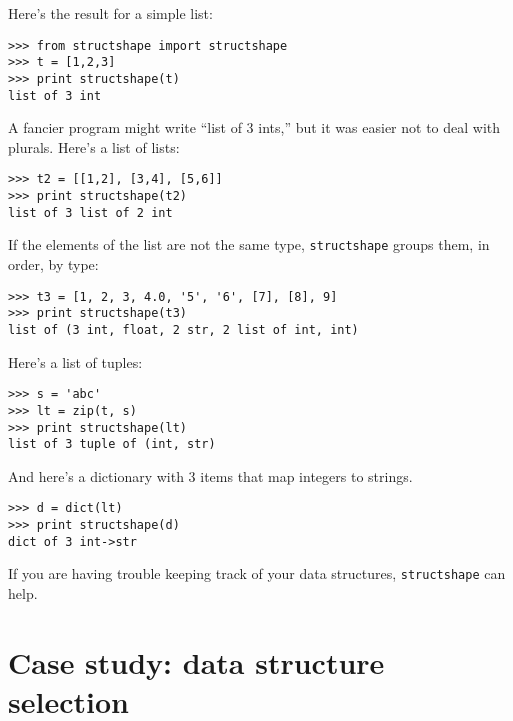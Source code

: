 \documentclass{article}
\begin{document}
Here’s the result for a simple list:
\begin{verbatim}
>>> from structshape import structshape
>>> t = [1,2,3]
>>> print structshape(t)
list of 3 int
\end{verbatim}
A fancier program might write ``list of 3 ints,'' but it was easier not
to deal with plurals. Here’s a list of lists:
\begin{verbatim}
>>> t2 = [[1,2], [3,4], [5,6]]
>>> print structshape(t2)
list of 3 list of 2 int
\end{verbatim}
If the elements of the list are not the same type, \verb|structshape| groups
them, in order, by type:
\begin{verbatim}
>>> t3 = [1, 2, 3, 4.0, '5', '6', [7], [8], 9]
>>> print structshape(t3)
list of (3 int, float, 2 str, 2 list of int, int)
\end{verbatim}
Here's a list of tuples:
\begin{verbatim}
>>> s = 'abc'
>>> lt = zip(t, s)
>>> print structshape(lt)
list of 3 tuple of (int, str)
\end{verbatim}
And here's a dictionary with 3 items that map integers to strings.
\begin{verbatim}
>>> d = dict(lt)
>>> print structshape(d)
dict of 3 int->str
\end{verbatim}
If you are having trouble keeping track of your data structures,
\verb|structshape| can help.



\section{Case study: data structure selection}
\end{document}
